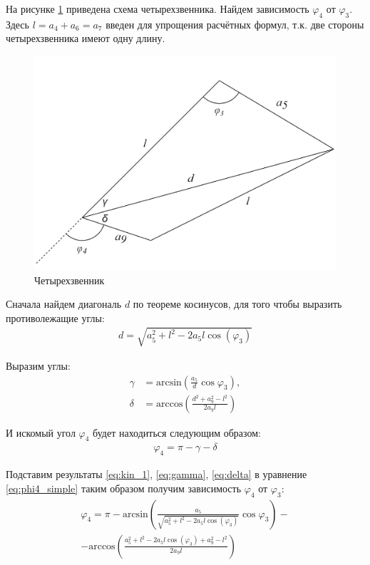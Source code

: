 На рисунке \ref{fig:scheme_four} приведена схема четырехзвенника. Найдем зависимость $ \varphi_4 $ от $ \varphi_3 $. Здесь $ l= a_4 + a_6=a_7 $ введен для упрощения расчётных формул, т.к. две стороны четырехзвенника имеют одну длину.
\begin{figure}[h]
    \centering
    \includegraphics[scale=1]{chapter_kinematics/figure4.png}
    \caption{Четырехзвенник}
    \label{fig:scheme_four}
\end{figure}

Сначала найдем диагональ $d$ по теореме косинусов, для того чтобы выразить противолежащие углы:
\begin{align}
    d = \sqrt{a_5^2 + l^2 - 2a_5 l \cos(\varphi_3)} \label{eq:kin_1}
\end{align}

\noindent Выразим углы:
\begin{align}
    \gamma &= \text{arcsin}\left(\frac{a_5}{d}\cos \varphi_3\right) \label{eq:gamma}, \\
    \delta &= \text{arccos}\left(\frac{d^2+a_9^2-l^2}{2 a_9 l}\right) \label{eq:delta}
\end{align}

\noindent И искомый угол $ \varphi_4 $ будет находиться следующим образом:
\begin{align}
    \varphi_4 = \pi - \gamma - \delta \label{eq:phi4_simple}
\end{align}

\noindent Подставим результаты \ref{eq:kin_1}, \ref{eq:gamma}, \ref{eq:delta} в уравнение \ref{eq:phi4_simple} таким образом получим  зависимость $ \varphi_4 $ от $ \varphi_3 $:
\begin{multline}
    \varphi_4 = \pi - \text{arcsin}\left(\frac{a_5}{\sqrt{a_5^2 + l^2 - 2a_5 l \cos(\varphi_3)}}\cos \varphi_3\right) - \\ - \text{arccos}\left(\frac{a_5^2 + l^2 - 2a_5 l \cos(\varphi_3)+a_9^2-l^2}{2 a_9 l}\right) 
\end{multline}

